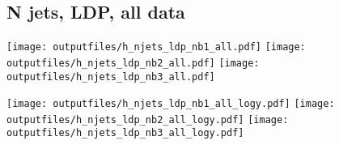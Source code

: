 \documentclass[11pt]{article}
\begin{document}
    \subsection{ N jets, LDP, all data}

    \noindent
     \texttt{[image: outputfiles/h\_njets\_ldp\_nb1\_all.pdf]}
     \texttt{[image: outputfiles/h\_njets\_ldp\_nb2\_all.pdf]}
     \texttt{[image: outputfiles/h\_njets\_ldp\_nb3\_all.pdf]}

    \noindent
     \texttt{[image: outputfiles/h\_njets\_ldp\_nb1\_all\_logy.pdf]}
     \texttt{[image: outputfiles/h\_njets\_ldp\_nb2\_all\_logy.pdf]}
     \texttt{[image: outputfiles/h\_njets\_ldp\_nb3\_all\_logy.pdf]}


  
\end{document}

